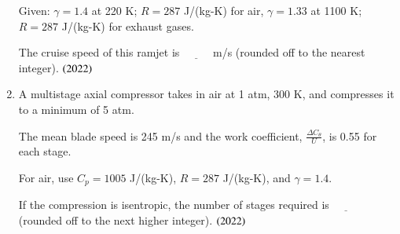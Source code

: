 \documentclass[journal,9pt,onecolumn]{IEEEtran}
\begin{document}
\begin{enumerate}
Given: $\gamma = 1.4$ at 220 K; $R = 287$ J/(kg-K) for air, $\gamma = 1.33$ at 1100 K; $R = 287$ J/(kg-K) for exhaust gases.

The cruise speed of this ramjet is $\underline{\hspace{1cm}}$ m/s (rounded off to the nearest integer).    \hfill $\left(2022\right)$

\item A multistage axial compressor takes in air at 1 atm, 300 K, and compresses it to a minimum of 5 atm.

The mean blade speed is 245 m/s and the work coefficient, $\frac{\Delta C_\theta}{U}$, is 0.55 for each stage.  

For air, use $C_p = 1005$ J/(kg-K), $R = 287$ J/(kg-K), and $\gamma = 1.4$.

If the compression is isentropic, the number of stages required is $\underline{\hspace{1cm}}$ (rounded off to the next higher integer).  \hfill $\left(2022\right)$
\end{enumerate}
\end{document}

